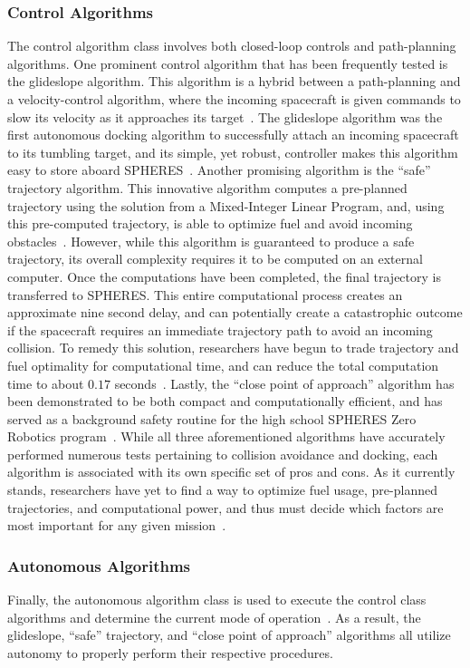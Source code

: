 \documentclass[journal, 10pt]{IEEEtran}
\begin{document}
\subsubsection{Control Algorithms}
The control algorithm class involves both closed-loop controls and path-planning algorithms. One prominent control algorithm that has been frequently tested is the glideslope algorithm. This algorithm is a hybrid between a path-planning and a velocity-control algorithm, where the incoming spacecraft is given commands to slow its velocity as it approaches its target~\cite{SPHERES_form, SPHERES_micro, dist, virt_sim}. The glideslope algorithm was the first autonomous docking algorithm to successfully attach an incoming spacecraft to its tumbling target, and its simple, yet robust, controller makes this algorithm easy to store aboard SPHERES~\cite{SPHERES_micro}. Another promising algorithm is the ``safe'' trajectory algorithm. This innovative algorithm computes a pre-planned trajectory using the solution from a Mixed-Integer Linear Program, and, using this pre-computed trajectory, is able to optimize fuel and avoid incoming obstacles~\cite{SPHERES_micro}. However, while this algorithm is guaranteed to produce a safe trajectory, its overall complexity requires it to be computed on an external computer. Once the computations have been completed, the final trajectory is transferred to SPHERES. This entire computational process creates an approximate nine second delay, and can potentially create a catastrophic outcome if the spacecraft requires an immediate trajectory path to avoid an incoming collision. To remedy this solution, researchers have begun to trade trajectory and fuel optimality for computational time, and can reduce the total computation time to about $0.17$ seconds~\cite{SPHERES_micro}. Lastly, the ``close point of approach'' algorithm has been demonstrated to be both compact and computationally efficient, and has served as a background safety routine for the high school SPHERES Zero Robotics program~\cite{virt_sim}. While all three aforementioned algorithms have accurately performed numerous tests pertaining to collision avoidance and docking, each algorithm is associated with its own specific set of pros and cons. As it currently stands, researchers have yet to find a way to optimize fuel usage, pre-planned trajectories, and computational power, and thus must decide which factors are most important for any given mission~\cite{SPHERES_form, SPHERES_micro, dist, virt_sim}.

\subsubsection{Autonomous Algorithms}
Finally, the autonomous algorithm class is used to execute the control class algorithms and determine the current mode of operation~\cite{SPHERES_form}. As a result, the glideslope, ``safe'' trajectory, and ``close point of approach'' algorithms all utilize autonomy to properly perform their respective procedures.
\end{document}
